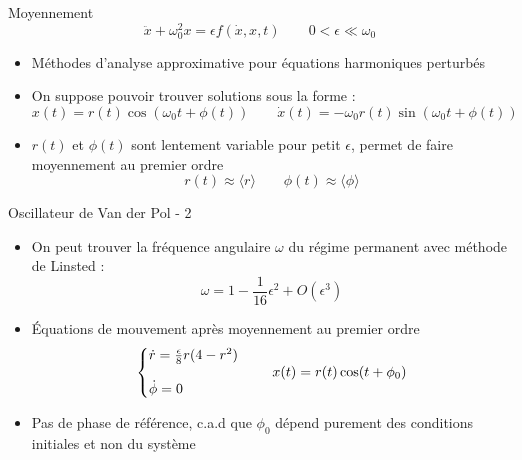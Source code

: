 \begin{frame}{Moyennement}
  $$ \ddot{x} + \omega_0^2 x = \epsilon f(\dot{x}, x, t) \qquad 0 < \epsilon \ll \omega_0 $$
  \begin{itemize}
      \item Méthodes d'analyse approximative pour équations harmoniques perturbés
      \item On suppose pouvoir trouver solutions sous la forme \cite{rand_lecture_2012} :
          $$x(t) = r(t)\cos(\omega_0 t + \phi(t)) \qquad \dot{x}(t) =  -\omega_0 r(t)\sin(\omega_0 t + \phi(t))$$
      \item $r(t)$ et $\phi(t)$ sont lentement variable pour petit $\epsilon$, permet de faire moyennement au premier ordre
          $$ r(t) \approx \langle r \rangle \qquad \phi(t) \approx \langle \phi \rangle $$
  \end{itemize}
\end{frame}

\begin{frame}{Oscillateur de Van der Pol - 2}
    \begin{itemize}
      \item On peut trouver la fréquence angulaire $\omega$ du régime permanent avec méthode de Linsted \cite{rand_lecture_2012} :
      \[ \omega = 1 - \frac{1}{16}\epsilon^2 + O(\epsilon^3) \]
      \item Équations de mouvement après moyennement au premier ordre
      \begin{equation*}
        \left\{
        \begin{array}{@{}l@{}}
            \dot{r} = \frac{\epsilon}{8}r(4-r^2) \\
            \\
            \dot{\phi} = 0
        \end{array}
        \right.\,
        \qquad 
        x(t) = r(t)\cos(t+\phi_0)
      \end{equation*}
    \item Pas de phase de référence, c.a.d que $\phi_0$ dépend purement des conditions initiales et non du système
    \end{itemize}
  \end{frame}

